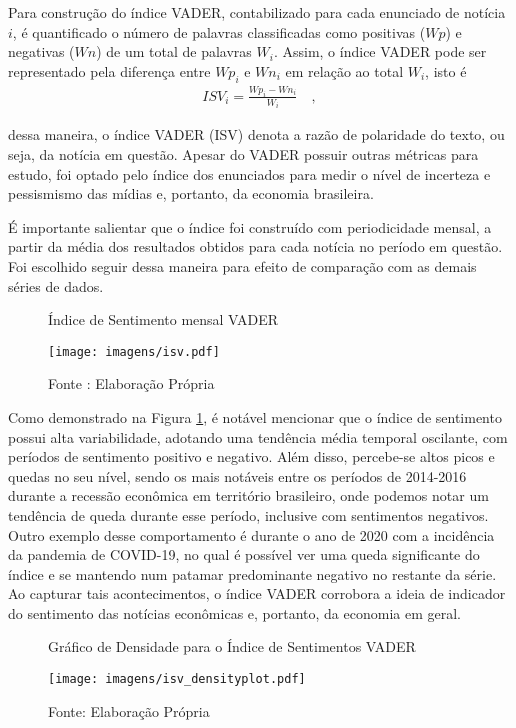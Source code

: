 Para construção do índice VADER, contabilizado para cada enunciado de notícia $i$, é quantificado o número de palavras classificadas como positivas ($Wp$) e negativas ($Wn$) de um total de palavras $W_i$. Assim, o índice VADER pode ser representado pela diferença entre $Wp_i$ e $Wn_i$ em relação ao total $W_i$, isto é
\begin{align} \label{indicevader}
    ISV_i = \frac{Wp_i - Wn_i}{W_i} \quad ,
\end{align}

\noindent dessa maneira, o índice VADER (ISV) denota a razão de polaridade do texto, ou seja, da notícia em questão. Apesar do VADER possuir outras métricas para estudo, foi optado pelo índice dos enunciados para medir o nível de incerteza e pessismismo das mídias e, portanto, da economia brasileira.

É importante salientar que o índice foi construído com periodicidade mensal, a partir da média dos resultados obtidos para cada notícia no período em questão. Foi escolhido seguir dessa maneira para efeito de comparação com as demais séries de dados.

\begin{figure}[!h]
    \centering
    \caption{Índice de Sentimento mensal VADER}
    \label{fig: ISV}
    \texttt{[image: imagens/isv.pdf]}
    \caption*{Fonte : Elaboração Própria}
\end{figure}

Como demonstrado na Figura \ref{fig: ISV}, é notável mencionar que o índice de sentimento possui alta variabilidade, adotando uma tendência média temporal oscilante, com períodos de sentimento positivo e negativo. Além disso, percebe-se altos picos e quedas no seu nível, sendo os mais notáveis entre os períodos de 2014-2016 durante a recessão econômica em território brasileiro, onde podemos notar um tendência de queda durante esse período, inclusive com sentimentos negativos. Outro exemplo desse comportamento é durante o ano de 2020 com a incidência da pandemia de COVID-19, no qual é possível ver uma queda significante do índice e se mantendo num patamar predominante negativo no restante da série. Ao capturar tais acontecimentos, o índice VADER corrobora a ideia de indicador do sentimento das notícias econômicas e, portanto, da economia em geral.

\begin{figure}[!h]
    \centering
    \caption{Gráfico de Densidade para o Índice de Sentimentos VADER}
    \label{fig: ISV density}
    \texttt{[image: imagens/isv\_densityplot.pdf]}
    \caption*{Fonte: Elaboração Própria}
\end{figure}

